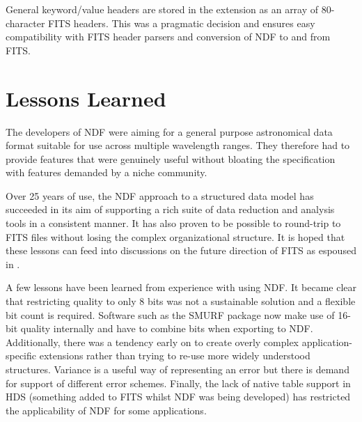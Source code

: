 \documentclass[11pt,twoside]{article}
\begin{document}
General keyword/value headers are stored in the extension as an array of
80-character FITS headers. This was a pragmatic decision and ensures
easy compatibility with FITS header parsers and conversion of NDF to
and from FITS.

\section{Lessons Learned}

The developers of NDF were aiming for a general purpose astronomical
data format suitable for use across multiple wavelength ranges. They
therefore had to provide features that were genuinely useful without
bloating the specification with features demanded by a niche
community.

Over 25 years of use, the NDF approach to a structured data model has
succeeded in its aim of supporting a rich suite of data reduction and
analysis tools in a consistent manner. It has also proven to be
possible to round-trip to FITS files without losing the complex
organizational structure. It is hoped that these lessons can feed into
discussions on the future direction of FITS as espoused in
\citet{P90_adassxxiii}.

A few lessons have been learned from experience with using NDF. It
became clear that restricting quality to only 8 bits was not a
sustainable solution and a flexible bit count is required. Software
such as the SMURF package \citep{2013MNRAS.430.2545C} now make use of
16-bit quality internally and have to combine bits when exporting to
NDF. Additionally, there was a tendency early on to create overly
complex application-specific extensions rather than trying to re-use
more widely understood structures. Variance is a useful way of
representing an error but there is demand for support of different
error schemes. Finally, the lack of native table support in HDS
(something added to FITS \citep{1988A&AS...73..365H} whilst NDF was
being developed) has restricted the applicability of NDF for some
applications.


\end{document}
